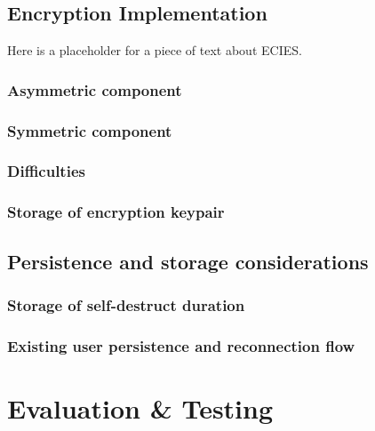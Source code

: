 \documentclass{mproj}
\begin{document}
\section{Encryption Implementation}\label{encryption}
\cite{martinez2010comparison}Here is a placeholder for a piece of text about ECIES.
\subsection{Asymmetric component}\label{asymmetric}

\subsection{Symmetric component}\label{symmetric}

\subsection{Difficulties}\label{encryptionDifficulties}

\subsection{Storage of encryption keypair}

\section{Persistence and storage considerations}
\subsection{Storage of self-destruct duration}
\subsection{Existing user persistence and reconnection flow}

\section{}

\section{}

\chapter{Evaluation \& Testing}\label{testing}
\end{document}
